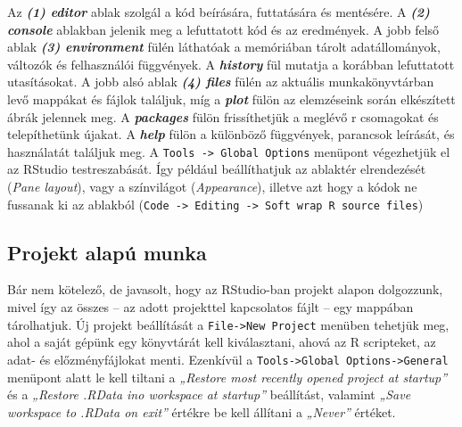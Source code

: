 \documentclass[
]{book}
\begin{document}
Az \textbf{\emph{(1) editor}} ablak szolgál a kód beírására, futtatására
és mentésére. A \textbf{\emph{(2) console}} ablakban jelenik meg a
lefuttatott kód és az eredmények. A jobb felső ablak \textbf{\emph{(3)
environment}} fülén láthatóak a memóriában tárolt adatállományok,
változók és felhasználói függvények. A \textbf{\emph{history}} fül
mutatja a korábban lefuttatott utasításokat. A jobb alsó ablak
\textbf{\emph{(4) files}} fülén az aktuális munkakönyvtárban levő
mappákat és fájlok találjuk, míg a \textbf{\emph{plot}} fülön az
elemzéseink során elkészített ábrák jelennek meg. A
\textbf{\emph{packages}} fülön frissíthetjük a meglévő r csomagokat és
telepíthetünk újakat. A \textbf{\emph{help}} fülön a különböző
függvények, parancsok leírását, és használatát találjuk meg. A
\texttt{Tools\ -\textgreater{}\ Global\ Options} menüpont végezhetjük el
az RStudio testreszabását. Így például beállíthatjuk az ablaktér
elrendezését (\emph{Pane layout}), vagy a színvilágot
(\emph{Appearance}), illetve azt hogy a kódok ne fussanak ki az ablakból
(\texttt{Code\ -\textgreater{}\ Editing\ -\textgreater{}\ Soft\ wrap\ R\ source\ files})

\hypertarget{projektmunka}{%
\subsection{Projekt alapú munka}\label{projektmunka}}

Bár nem kötelező, de javasolt, hogy az RStudio-ban projekt alapon
dolgozzunk, mivel így az összes -- az adott projekttel kapcsolatos fájlt
-- egy mappában tárolhatjuk. Új projekt beállítását a
\texttt{File-\textgreater{}New\ Project} menüben tehetjük meg, ahol a
saját gépünk egy könyvtárát kell kiválasztani, ahová az R scripteket, az
adat- és előzményfájlokat menti. Ezenkívül a
\texttt{Tools-\textgreater{}Global\ Options-\textgreater{}General}
menüpont alatt le kell tiltani a \emph{„Restore most recently opened
project at startup''} és a \emph{„Restore .RData ino workspace at
startup''} beállítást, valamint \emph{„Save workspace to .RData on
exit''} értékre be kell állítani a \emph{„Never''} értéket.
\end{document}
